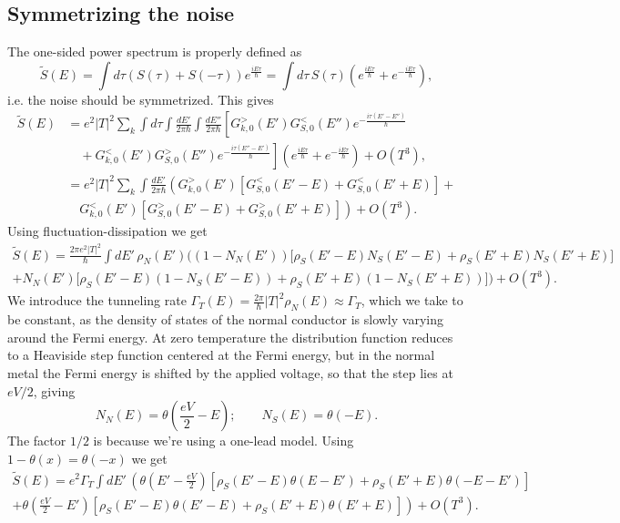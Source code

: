 \subsection{Symmetrizing the noise}
The one-sided power spectrum is properly defined as
\begin{equation}
    \tilde{S}(E) = \int d\tau \left(S(\tau) + S(-\tau)\right)e^{\frac{iE\tau}{\hbar}} = \int d\tau\,S(\tau)\left(e^{\frac{iE\tau}{\hbar}}+e^{-\frac{iE\tau}{\hbar}}\right),
\end{equation}
i.e. the noise should be symmetrized. This gives
\begin{align}
    \tilde{S}(E) &= e^2|T|^2 \sum_k \int d\tau \int \frac{dE'}{2\pi\hbar} \int\frac{dE''}{2\pi\hbar} \left[G^>_{k,0}(E')G^<_{S,0}(E'')e^{-\frac{i\tau(E'-E'')}{\hbar}} \right. \nonumber \\ 
    &\left.\quad+ G^<_{k,0}(E')G^>_{S,0}(E'')e^{-\frac{i\tau(E''-E')}{\hbar}}\right]\left(e^{\frac{iE\tau}{\hbar}}+e^{-\frac{iE\tau}{\hbar}}\right) + O(T^3), \nonumber\\
    &=e^2|T|^2 \sum_k \int \frac{dE'}{2\pi\hbar}\left(G^>_{k,0}(E')\left[G^<_{S,0}(E'-E) + G^<_{S,0}(E'+E)\right]+\right.\nonumber\\
    &\left. \quad G^<_{k,0}(E')\left[G^>_{S,0}(E'-E) + G^>_{S,0}(E'+E)\right]\right)+ O(T^3).
\end{align}
Using fluctuation-dissipation we get
\begin{align}\label{eq:shotnoise}
    \tilde{S}(E) = \frac{2\pi e^2|T|^2}{\hbar} \int dE'\,\rho_N(E')\biggl((1-N_N(E'))\bigl[\rho_S(E'-E)N_S(E'-E) + \rho_S(E'+E)N_S(E'+E)\bigr]\nonumber\\
    + N_N(E')\bigl[\rho_S(E'-E)(1-N_S(E'-E)) + \rho_S(E'+E)(1-N_S(E'+E))\bigr]\biggr) + O(T^3).
\end{align}
We introduce the tunneling rate $\Gamma_T(E) = \frac{2\pi}{\hbar}|T|^2 \rho_N(E) \approx \Gamma_T$, which we take to be constant, as the density of states of the normal conductor is slowly varying around the Fermi energy. At zero temperature the distribution function reduces to a Heaviside step function centered at the Fermi energy, but in the normal metal the Fermi energy is shifted by the applied voltage, so that the step lies at $eV/2$, giving
\begin{equation}
    N_N(E) = \theta\left(\frac{eV}{2}-E\right); \qquad N_S(E) = \theta\left(-E\right).
\end{equation}
The factor $1/2$ is because we're using a one-lead model. Using $1-\theta(x) = \theta(-x)$ we get
\begin{align}
    \tilde{S}(E) = e^2\Gamma_T \int dE'\,\left(\theta\left(E'-\frac{eV}{2}\right)\left[\rho_S(E'-E)\theta\left(E-E'\right) + \rho_S(E'+E)\theta\left(-E-E'\right)\right]\right.\nonumber\\
    \left.+ \theta\left(\frac{eV}{2}-E'\right)\left[\rho_S(E'-E)\theta\left(E'-E\right) + \rho_S(E'+E)\theta\left(E'+E\right)\right]\right) + O(T^3).
\end{align}
